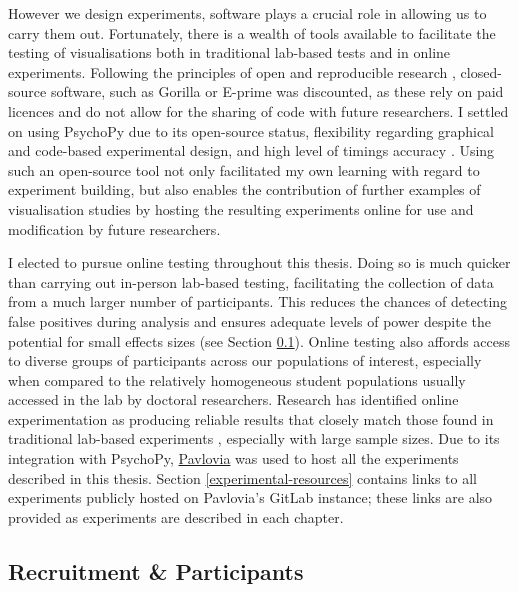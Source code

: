 \documentclass[../main.tex]{subfiles}
\begin{document}
However we design experiments, software plays a crucial role in allowing
us to carry them out. Fortunately, there is a wealth of tools available
to facilitate the testing of visualisations both in traditional
lab-based tests and in online experiments. Following the principles of
open and reproducible research \cite{ayris_2018}, closed-source
software, such as Gorilla \cite{anwyl_2020} or E-prime
\cite{eprime_2020} was discounted, as these rely on paid licences and do
not allow for the sharing of code with future researchers. I settled on
using PsychoPy \cite{peirce_2019} due to its open-source status,
flexibility regarding graphical and code-based experimental design, and
high level of timings accuracy \cite{bridges_2020}. Using such an
open-source tool not only facilitated my own learning with regard to
experiment building, but also enables the contribution of further
examples of visualisation studies by hosting the resulting experiments
online for use and modification by future researchers.

I elected to pursue online testing throughout this thesis. Doing so is
much quicker than carrying out in-person lab-based testing, facilitating
the collection of data from a much larger number of participants. This
reduces the chances of detecting false positives during analysis and
ensures adequate levels of power despite the potential for small effects
sizes (see Section \ref{recruitment}). Online testing also affords
access to diverse groups of participants across our populations of
interest, especially when compared to the relatively homogeneous student
populations usually accessed in the lab by doctoral researchers.
Research has identified online experimentation as producing reliable
results that closely match those found in traditional lab-based
experiments \cite{arechar_2018, hirao_2021, prisse_2022}, especially
with large sample sizes. Due to its integration with PsychoPy,
\href{pavlovia.org}{Pavlovia} was used to host all the experiments
described in this thesis. Section \ref{experimental-resources} contains
links to all experiments publicly hosted on Pavlovia's GitLab instance;
these links are also provided as experiments are described in each
chapter.

\subsection{Recruitment \& Participants}\label{recruitment}
\end{document}

